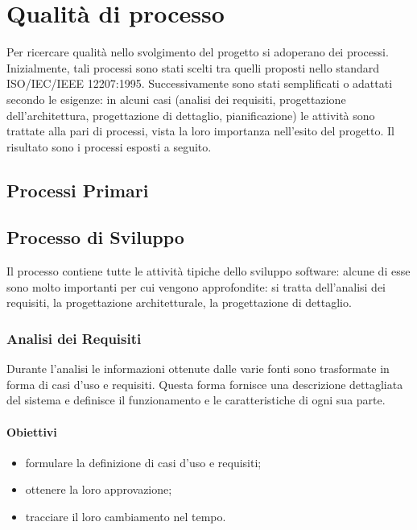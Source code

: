 \section{Qualità di processo}
Per ricercare qualità nello svolgimento del progetto si adoperano dei processi. Inizialmente, tali processi sono stati scelti tra quelli proposti nello standard ISO/IEC/IEEE 12207:1995. Successivamente sono stati semplificati o adattati secondo le esigenze: in alcuni casi (analisi dei requisiti, progettazione dell'architettura, progettazione di dettaglio, pianificazione) le attività sono trattate alla pari di processi, vista la loro importanza nell'esito del progetto.\newline 
Il risultato sono i processi esposti a seguito.


\subsection{Processi Primari}
	\subsection{Processo di Sviluppo}
	Il processo contiene tutte le attività tipiche dello sviluppo software: alcune di esse sono molto importanti per cui vengono approfondite: si tratta dell'analisi dei requisiti, la progettazione architetturale, la progettazione di dettaglio.
	\subsubsection{Analisi dei Requisiti}
	Durante l'analisi le informazioni ottenute dalle varie fonti sono trasformate in forma di casi d'uso e requisiti.
	Questa forma fornisce una descrizione dettagliata del sistema e definisce il funzionamento e le caratteristiche di ogni sua parte.
		\paragraph{Obiettivi}
		\begin{itemize}
			\item formulare la definizione di casi d'uso e requisiti;
			\item ottenere la loro approvazione;
			\item tracciare il loro cambiamento nel tempo.
		\end{itemize}		
